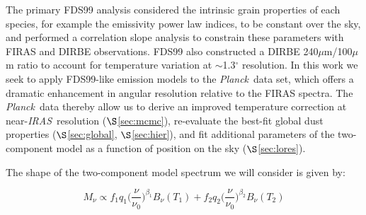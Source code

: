 \documentclass{emulateapj}
\newcommand{\IRAS}{{\it IRAS}}
\newcommand{\PLANCK}{{\it Planck}}
\begin{document}
The primary FDS99 analysis considered the intrinsic grain properties of each
species, for example the emissivity power law indices, to be constant over the 
sky, and performed a correlation slope analysis to constrain these parameters 
with FIRAS and DIRBE observations. FDS99 also constructed a DIRBE 
240$\mu$m/100$\mu$m ratio to account for temperature variation at 
$\sim$1.3$^{\circ}$ resolution. In this work we seek to apply FDS99-like 
emission models to the \PLANCK~data set, which offers a dramatic enhancement in
angular resolution relative to the FIRAS spectra. The \PLANCK~data thereby 
allow us to derive an improved temperature correction at near-\IRAS~resolution
($\S$\ref{sec:mcmc}), re-evaluate the best-fit global dust properties 
($\S$\ref{sec:global}, $\S$\ref{sec:hier}), and fit additional parameters 
of the two-component model as a function of position on the sky 
($\S$\ref{sec:lores}). 





The shape of the two-component model spectrum we will consider is given by:

\begin{equation}
M_{\nu} \propto f_{1}q_{1}\Big(\frac{\nu}{\nu_{0}}\Big)^{\beta_1}B_{\nu}(T_1) + f_{2}q_{2}\Big(\frac{\nu}{\nu_0}\Big)^{\beta_2}B_{\nu}(T_2)
\end{equation}

 

\end{document}
